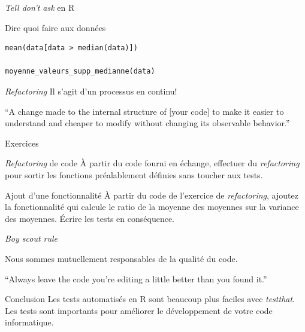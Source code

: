 \documentclass[11pt]{beamer}
\begin{document}
\begin{frame}[fragile]{\textit{Tell don't ask} en R}
\begin{block}{Dire quoi faire aux données}
\begin{lstlisting}
mean(data[data > median(data)])

moyenne_valeurs_supp_medianne(data)
\end{lstlisting}
\end{block}
\end{frame}

\begin{frame}{\textit{Refactoring}}
Il s'agit d'un processus en continu!
\begin{block}{}
{\large ``A change made to the internal structure of [your code] to make it easier to understand and cheaper to modify without changing its observable behavior.''}
\vskip5mm
\hspace*{}
\end{block}
\end{frame}

\begin{frame}{Exercices}
\begin{block}{\textit{Refactoring} de code}
À partir du code fourni en échange, effectuer du \textit{refactoring} pour sortir les fonctions préalablement définies sans toucher aux tests.
\end{block}

\begin{block}{Ajout d'une fonctionnalité}
À partir du code de l'exercice de \textit{refactoring}, ajoutez la fonctionnalité qui calcule le ratio de la moyenne des moyennes sur la variance des moyennes. Écrire les tests en conséquence.
\end{block}
\end{frame}

\begin{frame}{\textit{Boy scout rule}}

Nous sommes mutuellement responsables de la qualité du code.

\begin{block}{}
{\large ``Always leave the code you're editing a little better than you found it.''}
\vskip5mm
\hspace*{}
\end{block}
\end{frame}


\begin{frame}{Conclusion}
Les tests automatisés en R sont beaucoup plus faciles avec \textit{testthat}. Les tests sont importants pour améliorer le développement de votre code informatique.
\end{frame}
\end{document}
